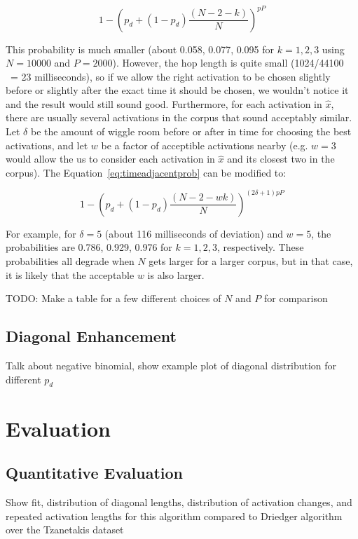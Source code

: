 \documentclass{article}
\begin{document}
\begin{equation}
    \label{eq:timeadjacentprob}
    1 - \left( p_d + (1-p_d) \frac{(N-2-k)}{N} \right)^{pP}
\end{equation}

This probability is much smaller (about 0.058, 0.077, 0.095 for $k = 1, 2, 3$ using $N=10000$ and $P=2000$).  However, the hop length is quite small (1024/44100 ~= 23 milliseconds), so if we allow the right activation to be chosen slightly before or slightly after the exact time it should be chosen, we wouldn't notice it and the result would still sound good.  Furthermore, for each activation in $\hat{x}$, there are usually several activations in the corpus that sound acceptably similar.  Let $\delta$ be the amount of wiggle room before or after in time for choosing the best activations, and let $w$ be a factor of acceptible activations nearby (e.g. $w=3$ would allow the us to consider each activation in $\hat{x}$ and its closest two in the corpus).  The Equation~\ref{eq:timeadjacentprob} can be modified to:

\begin{equation}
    \label{eq:timeadjacentprobmodified}
    1 - \left( p_d + (1-p_d) \frac{(N-2-wk)}{N} \right)^{(2 \delta +1)pP}
\end{equation}

For example, for $\delta=5$ (about 116 milliseconds of deviation) and $w = 5$, the probabilities are 0.786, 0.929, 0.976 for $k=1, 2, 3$, respectively.  These probabilities all degrade when $N$ gets larger for a larger corpus, but in that case, it is likely that the acceptable $w$ is also larger.


TODO: Make a table for a few different choices of $N$ and $P$ for comparison


\subsection{Diagonal Enhancement}

Talk about negative binomial, show example plot of diagonal distribution for different $p_d$


\section{Evaluation}

\subsection{Quantitative Evaluation}
Show fit, distribution of diagonal lengths, distribution of activation changes, and repeated activation lengths for this algorithm compared to Driedger algorithm over the Tzanetakis dataset
\end{document}
